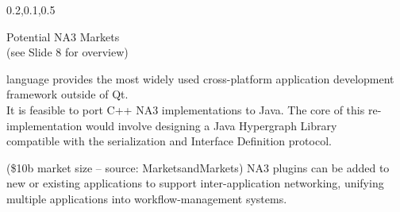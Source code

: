 \begin{frame}{}
{\begin{center}
\begin{minipage}{\textwidth}
{\begin{minipage}{\textwidth}
\begin{lightquadblockc}{0.2,0.1,0.5}{\parbox{21cm}{\vspace*{10pt}\centering Potential NA3 Markets \\(see Slide 8 for overview)\vspace*{10pt}}}
\begin{minipage}{1.08\textwidth}
{\begin{description}
language provides the most widely used cross-platform 
application development framework outside of Qt.  
\\It is feasible to port C++ NA3 implementations 
to Java.  The core of this re-implementation would 
involve designing a Java Hypergraph Library \\compatible 
with the \AtR{} serialization and Interface Definition 
protocol.\vspace{10pt}
\item[Workflow Management] 
({\texttildelow}\$10b market size -- 
source: 
{\selectfont MarketsandMarkets}) 
NA3 plugins can be added to new or existing 
applications to support inter-application 
networking, unifying multiple applications into workflow-management systems.
\vspace{.75em}  
\end{description}}\end{minipage}
\end{lightquadblockc}
\end{minipage}}


\end{minipage}
\end{center}
}

\end{frame}
